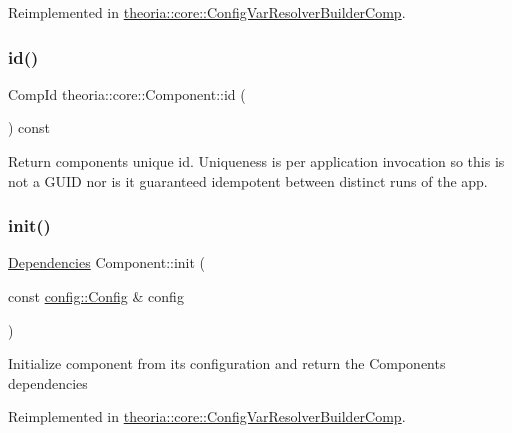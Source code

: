 Reimplemented in \hyperlink{classtheoria_1_1core_1_1ConfigVarResolverBuilderComp_ac1e585a908c7e0fa7db4bdf0a8b514bb}{theoria\+::core\+::\+Config\+Var\+Resolver\+Builder\+Comp}.

\mbox{\label{classtheoria_1_1core_1_1Component_ab539df9f996efceda7743fa1b69cd25d}} 
\subsubsection{\texorpdfstring{id()}{id()}}
{\footnotesize\ttfamily Comp\+Id theoria\+::core\+::\+Component\+::id (\begin{DoxyParamCaption}{ }\end{DoxyParamCaption}) const\hspace{0.3cm}{\ttfamily [inline]}}

Return components unique id. Uniqueness is per application invocation so this is not a G\+U\+ID nor is it guaranteed idempotent between distinct runs of the app. \mbox{\label{classtheoria_1_1core_1_1Component_a7ed45f6e38442a40666ae4556f794f7d}} 
\subsubsection{\texorpdfstring{init()}{init()}}
{\footnotesize\ttfamily \hyperlink{classtheoria_1_1core_1_1Dependencies}{Dependencies} Component\+::init (\begin{DoxyParamCaption}\item[{const \hyperlink{classtheoria_1_1config_1_1Config}{config\+::\+Config} \&}]{config }\end{DoxyParamCaption})\hspace{0.3cm}{\ttfamily [virtual]}}

Initialize component from its configuration and return the Components dependencies 

Reimplemented in \hyperlink{classtheoria_1_1core_1_1ConfigVarResolverBuilderComp_aadf94c8b3d765667eaf9d7c91ac65342}{theoria\+::core\+::\+Config\+Var\+Resolver\+Builder\+Comp}.

\mbox{\label{classtheoria_1_1core_1_1Component_ae0a32f194c007fe419ec9ae9303025fc}} 
